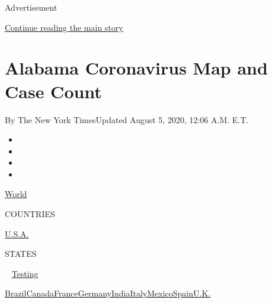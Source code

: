 Advertisement

\protect\hyperlink{after-top}{Continue reading the main story}

\hypertarget{alabama-coronavirus-map-and-case-count}{%
\section{Alabama Coronavirus Map and Case
Count}\label{alabama-coronavirus-map-and-case-count}}

By The New York TimesUpdated August 5, 2020, 12:06 A.M. E.T.

\begin{itemize}
\item
\item
\item
\item
\end{itemize}

\href{https://www.nytimes.com/interactive/2020/world/coronavirus-maps.html}{World}~

COUNTRIES

\textbar{}
\href{https://www.nytimes.com/interactive/2020/us/coronavirus-us-cases.html}{U.S.A.}~

STATES

~
\href{https://www.nytimes.com/interactive/2020/us/coronavirus-testing.html}{Testing}

\href{https://www.nytimes.com/interactive/2020/world/americas/brazil-coronavirus-cases.html}{Brazil}\href{https://www.nytimes.com/interactive/2020/world/canada/canada-coronavirus-cases.html}{Canada}\href{https://www.nytimes.com/interactive/2020/world/europe/france-coronavirus-cases.html}{France}\href{https://www.nytimes.com/interactive/2020/world/europe/germany-coronavirus-cases.html}{Germany}\href{https://www.nytimes.com/interactive/2020/world/asia/india-coronavirus-cases.html}{India}\href{https://www.nytimes.com/interactive/2020/world/europe/italy-coronavirus-cases.html}{Italy}\href{https://www.nytimes.com/interactive/2020/world/americas/mexico-coronavirus-cases.html}{Mexico}\href{https://www.nytimes.com/interactive/2020/world/europe/spain-coronavirus-cases.html}{Spain}\href{https://www.nytimes.com/interactive/2020/world/europe/united-kingdom-coronavirus-cases.html}{U.K.}

